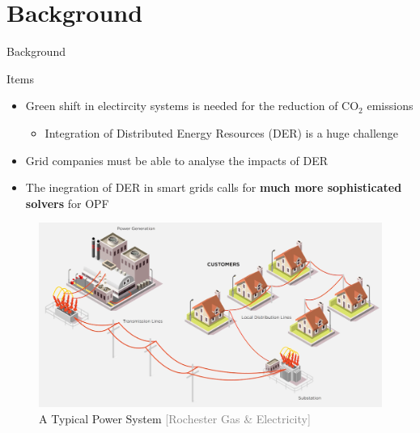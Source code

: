 \documentclass{beamer}
\begin{document}
\section{Background}
\begin{frame}{Background}
\begin{block}{Items}

\begin{itemize}
\item <1-> \small Green shift in electircity systems is needed for the reduction of $\mathrm{CO_2}$ emissions
\begin{itemize}
\item<2-> \tiny  Integration of Distributed Energy Resources (DER) is a huge challenge
\end{itemize}
\item<3->\small Grid companies must be able to analyse the impacts of DER 
\item<5->\small The inegration of DER in smart grids calls for \textbf{much more sophisticated solvers} for OPF
\end{itemize}
\end{block}
\begin{figure}
\includegraphics[scale=0.06]{Figures/PowerSys.png}
 \caption{A Typical Power System \textcolor{gray}{\tiny[Rochester Gas \& Electricity]}}
\end{figure}

\end{frame}
\end{document}
